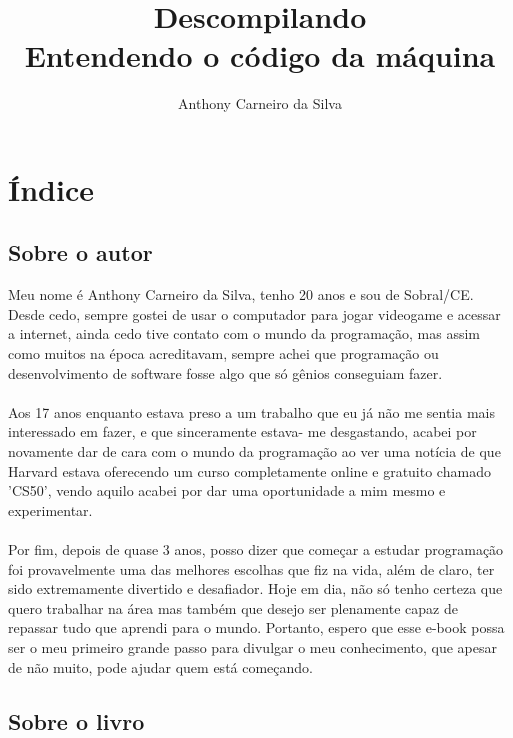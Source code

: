 \documentclass{book}
\title{Descompilando\\ \large Entendendo o código da máquina}
\author{Anthony Carneiro da Silva}
\begin{document}
\maketitle

\clearpage

\tableofcontents

\clearpage

\chapter{Índice}
\clearpage

\section{Sobre o autor}

Meu nome é Anthony Carneiro da Silva, tenho 20 anos e sou de 
Sobral/CE. Desde cedo, sempre gostei de usar o computador para jogar 
videogame e acessar a internet, ainda cedo tive contato com o mundo 
da programação, mas assim como muitos na época acreditavam, sempre 
achei que programação ou desenvolvimento de software fosse algo que 
só gênios conseguiam fazer.
\\\\
Aos 17 anos enquanto estava preso a um trabalho que eu 
já não me sentia mais interessado em fazer, e que sinceramente estava-
me desgastando, acabei por novamente dar de cara com o mundo da 
programação ao ver uma notícia de que Harvard estava oferecendo um curso 
completamente online e gratuito chamado 'CS50', vendo aquilo acabei por 
dar uma oportunidade a mim mesmo e experimentar.
\\\\
Por fim, depois de quase 3 anos, posso dizer que começar a 
estudar programação foi provavelmente uma das melhores escolhas que fiz 
na vida, além de claro, ter sido extremamente divertido e desafiador. 
Hoje em dia, não só tenho certeza que quero trabalhar na área mas 
também que desejo ser plenamente capaz de repassar tudo que aprendi 
para o mundo. Portanto, espero que esse e-book possa ser o meu primeiro 
grande passo para divulgar o meu conhecimento, que apesar de não muito, 
pode ajudar quem está começando.

\section{Sobre o livro}
\end{document}
